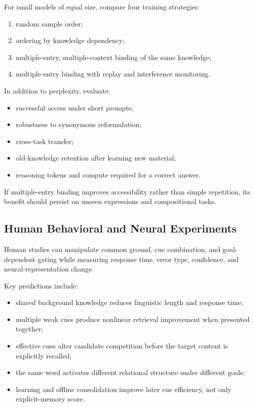 \documentclass[11pt, a4paper]{article}
\begin{document}
For small models of equal size, compare four training strategies:


\begin{enumerate}
\item random sample order;
\item ordering by knowledge dependency;
\item multiple-entry, multiple-context binding of the same knowledge;
\item multiple-entry binding with replay and interference monitoring.
\end{enumerate}


In addition to perplexity, evaluate:


\begin{itemize}
\item successful access under short prompts;
\item robustness to synonymous reformulation;
\item cross-task transfer;
\item old-knowledge retention after learning new material;
\item reasoning tokens and compute required for a correct answer.
\end{itemize}


If multiple-entry binding improves accessibility rather than simple repetition, its benefit should persist on unseen expressions and compositional tasks.


\subsection{Human Behavioral and Neural Experiments}


Human studies can manipulate common ground, cue combination, and goal-dependent gating while measuring response time, error type, confidence, and neural-representation change.


Key predictions include:


\begin{itemize}
\item shared background knowledge reduces linguistic length and response time;
\item multiple weak cues produce nonlinear retrieval improvement when presented together;
\item effective cues alter candidate competition before the target content is explicitly recalled;
\item the same word activates different relational structure under different goals;
\item learning and offline consolidation improve later cue efficiency, not only explicit-memory score.
\end{itemize}
\end{document}
